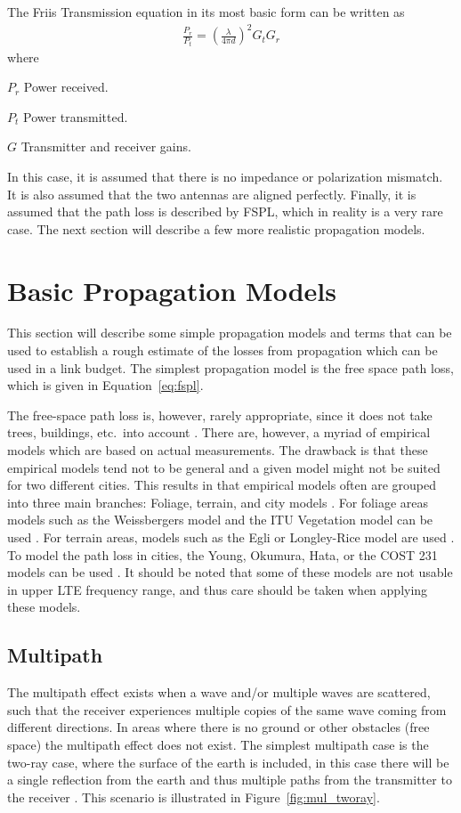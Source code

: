 The Friis Transmission equation in its most basic form can be written as \cite{balanis2012antenna} 
\begin{align}%
    \frac{P_r}{P_t} = \left( \frac{\lambda}{4 \pi d} \right)^2 G_{t} G_{r} 
\end{align}
where
\begin{where} 
\item[$P_r$] Power received.
\item[$P_t$] Power transmitted.
\item[$G$] Transmitter and receiver gains.
\end{where}
In this case, it is assumed that there is no impedance or polarization mismatch. It is also assumed that the two antennas are aligned perfectly. Finally, it is assumed that the path loss is described by FSPL, which in reality is a very rare case. The next section will describe a few more realistic propagation models.

\section{Basic Propagation Models}
\label{sec:propmodels}
This section will describe some simple propagation models and terms that can be used to establish a rough estimate of the losses from propagation which can be used in a link budget. The simplest propagation model is the free space path loss, which is given in Equation~\ref{eq:fspl}.

The free-space path loss is, however, rarely appropriate, since it does not take trees, buildings, etc.\ into account \cite{balanis2012antenna}. There are, however, a myriad of empirical models which are based on actual measurements. The drawback is that these empirical models tend not to be general and a given model might not be suited for two different cities. This results in that empirical models often are grouped into three main branches: Foliage, terrain, and city models \cite{goldsmith2005wireless}. For foliage areas models such as the Weissbergers model and the ITU Vegetation model can be used \cite{goldsmith2005wireless}. For terrain areas, models such as the Egli or Longley-Rice model are used \cite{goldsmith2005wireless}. To model the path loss in cities, the Young, Okumura, Hata, or the COST 231 models can be used \cite{goldsmith2005wireless}. It should be noted that some of these models are not usable in upper LTE frequency range, and thus care should be taken when applying these models. 

\subsection{Multipath}
The multipath effect exists when a wave and/or multiple waves are scattered, such that the receiver experiences multiple copies of the same wave coming from different directions. In areas where there is no ground or other obstacles (free space) the multipath effect does not exist. The simplest multipath case is the two-ray case, where the surface of the earth is included, in this case there will be a single reflection from the earth and thus multiple paths from the transmitter to the receiver \cite{parsons2000mobile}. This scenario is illustrated in Figure~\ref{fig:mul_tworay}.

